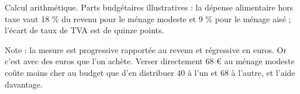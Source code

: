 Calcul arithmétique. Parts budgétaires illustratives : la dépense alimentaire hors taxe vaut 18 \% du revenu pour le ménage modeste et 9 \% pour le ménage aisé ; l'écart de taux de TVA est de quinze points.\par Note : la mesure est progressive rapportée au revenu et régressive en euros. Or c'est avec des euros que l'on achète. Verser directement 68 \euro{} au ménage modeste coûte moins cher au budget que d'en distribuer 40 à l'un et 68 à l'autre, et l'aide davantage.
